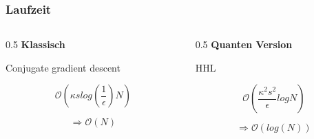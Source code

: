 \begin{frame}
    \frametitle{Laufzeit}
    \begin{columns}[c]
        \begin{column}{0.5\hsize}
            \textbf{Klassisch}

            \hfil

            Conjugate gradient descent 

            $$ \mathcal{O}(\kappa s log{\left(\frac 1 \epsilon\right)} N ) $$

            $$ \Rightarrow \mathcal{O} (N) $$

        \end{column}
        

        \begin{column}{0.5\hsize}
            \textbf{Quanten Version}

            \hfil

            HHL

            $$ \mathcal{O}(\frac{\kappa^2s^2}{\epsilon}logN) $$

            $$ \Rightarrow \mathcal{O} (log(N)) $$
        \end{column}

    \end{columns}
 
    \hfil

    \hfil



\end{frame}



